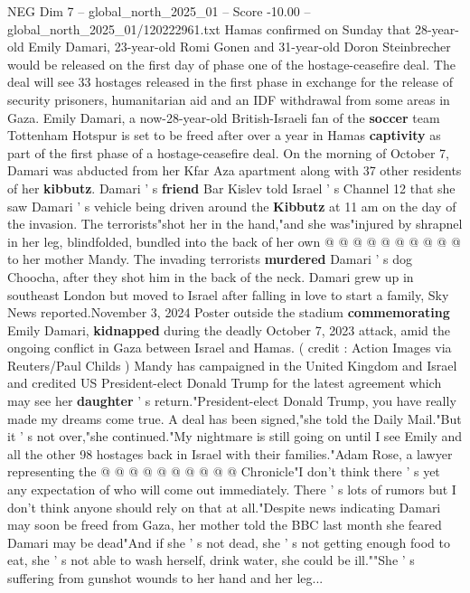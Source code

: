 \begin{textsample}{NEG Dim 7 – global\_north\_2025\_01 – Score -10.00 – global\_north\_2025\_01/120222961.txt}  \label{ex:f7_neg_058}
Hamas confirmed on Sunday that 28-year-old Emily Damari, 23-year-old Romi Gonen and 31-year-old Doron Steinbrecher would be released on the first day of phase one of the hostage-ceasefire deal.
The deal will see 33 hostages released in the first phase in exchange for the release of security prisoners, humanitarian aid and an IDF withdrawal from some areas in Gaza.
Emily Damari, a now-28-year-old British-Israeli fan of the \textbf{soccer} team Tottenham Hotspur is set to be freed after over a year in Hamas \textbf{captivity} as part of the first phase of a hostage-ceasefire deal.
On the morning of October 7, Damari was abducted from her Kfar Aza apartment along with 37 other residents of her \textbf{kibbutz}.
Damari ' s \textbf{friend} Bar Kislev told Israel ' s Channel 12 that she saw Damari ' s vehicle being driven around the \textbf{Kibbutz} at 11 am on the day of the invasion.
The terrorists"shot her in the hand,"and she was"injured by shrapnel in her leg, blindfolded, bundled into the back of her own @ @ @ @ @ @ @ @ @ @ to her mother Mandy.
The invading terrorists \textbf{murdered} Damari ' s dog Choocha, after they shot him in the back of the neck.
Damari grew up in southeast London but moved to Israel after falling in love to start a family, Sky News reported.November 3, 2024 Poster outside the stadium \textbf{commemorating} Emily Damari, \textbf{kidnapped} during the deadly October 7, 2023 attack, amid the ongoing conflict in Gaza between Israel and Hamas. ( credit : Action Images via Reuters/Paul Childs ) Mandy has campaigned in the United Kingdom and Israel and credited US President-elect Donald Trump for the latest agreement which may see her \textbf{daughter} ' s return."President-elect Donald Trump, you have really made my dreams come true.
A deal has been signed,"she told the Daily Mail."But it ' s not over,"she continued."My nightmare is still going on until I see Emily and all the other 98 hostages back in Israel with their families."Adam Rose, a lawyer representing the @ @ @ @ @ @ @ @ @ @ Chronicle"I don't think there ' s yet any expectation of who will come out immediately.
There ' s lots of rumors but I don't think anyone should rely on that at all."Despite news indicating Damari may soon be freed from Gaza, her mother told the BBC last month she feared Damari may be dead"And if she ' s not dead, she ' s not getting enough food to eat, she ' s not able to wash herself, drink water, she could be ill.""She ' s suffering from gunshot wounds to her hand and her leg...

\end{textsample}
